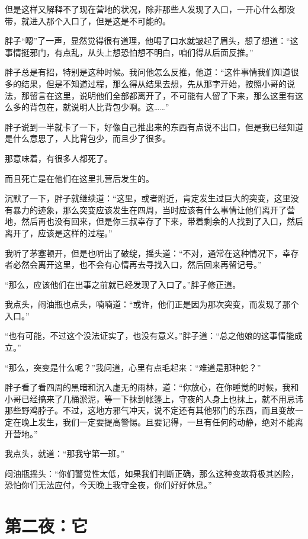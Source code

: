 但是这样又解释不了现在营地的状况，除非那些人发现了入口，一开心什么都没带，就进入那个入口了，但是这是不可能的。

胖子“嗯”了一声，显然觉得很有道理，他喝了口水就皱起了眉头，想了想道：“这事情挺邪门，有点乱，从头上想恐怕想不明白，咱们得从后面反推。”

胖子总是有招，特别是这种时候。我问他怎么反推，他道：“这件事情我们知道很多的结果，但是不知道过程，那么得从结果去想，先从那字开始，按照小哥的说法，那留言在这里，说明他们全部都离开了，不可能有人留了下来，那么这里有这么多的背包在，就说明人比背包少啊。这……”

胖子说到一半就卡了一下，好像自己推出来的东西有点说不出口，但是我已经知道是什么意思了，人比背包少，而且少了很多。

那意味着，有很多人都死了。

而且死亡是在他们在这里扎营后发生的。

沉默了一下，胖子就继续道：“这里，或者附近，肯定发生过巨大的突变，这里没有暴力的迹象，那么突变应该发生在四周，当时应该有什么事情让他们离开了营地，然后再也没有回来，但是你三叔幸存了下来，带着剩余的人找到了入口，然后离开了，应该是这样的过程。”

我听了茅塞顿开，但是也听出了破绽，摇头道：“不对，通常在这种情况下，幸存者必然会离开这里，也不会有心情再去寻找入口，然后回来再留记号。”

“那么，应该他们在出事之前就已经发现了入口了。”胖子修正道。

我点头，闷油瓶也点头，喃喃道：“或许，他们正是因为那次突变，而发现了那个入口。”

“也有可能，不过这个没法证实了，也没有意义。”胖子道：“总之他娘的这事情能成立。”

“那么，突变是什么呢？”我问道，心里有点毛起来：“难道是那种蛇？”

胖子看了看四周的黑暗和沉入虚无的雨林，道：“你放心，在你睡觉的时候，我和小哥已经搞来了几桶淤泥，等一下抹到帐篷上，守夜的人身上也抹上，就不用忌讳那些野鸡脖子。不过，这地方邪气冲天，说不定还有其他邪门的东西，而且变故一定在晚上发生，我们一定要提高警惕。且要记得，一旦有任何的动静，绝对不能离开营地。”

我点头，就道：“那我守第一班。”

闷油瓶摇头：“你们警觉性太低，如果我们判断正确，那么这种变故将极其凶险，恐怕你们无法应付，今天晚上我守全夜，你们好好休息。”

\chapter{第二夜：它}

